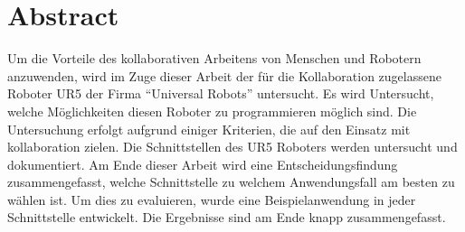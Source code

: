 \section*{Abstract}
\label{abstract}

Um die Vorteile des kollaborativen Arbeitens von Menschen und Robotern anzuwenden, wird im Zuge dieser Arbeit der für die Kollaboration zugelassene Roboter UR5 der Firma ``Universal Robots'' untersucht. Es wird Untersucht, welche Möglichkeiten diesen Roboter zu programmieren möglich sind. Die Untersuchung erfolgt aufgrund einiger Kriterien, die auf den Einsatz mit kollaboration zielen.
Die Schnittstellen des UR5 Roboters werden untersucht und dokumentiert.
Am Ende dieser Arbeit wird eine Entscheidungsfindung zusammengefasst, welche Schnittstelle zu welchem Anwendungsfall am besten zu wählen ist. Um dies zu evaluieren, wurde eine Beispielanwendung in jeder Schnittstelle entwickelt. Die Ergebnisse sind am Ende knapp zusammengefasst.